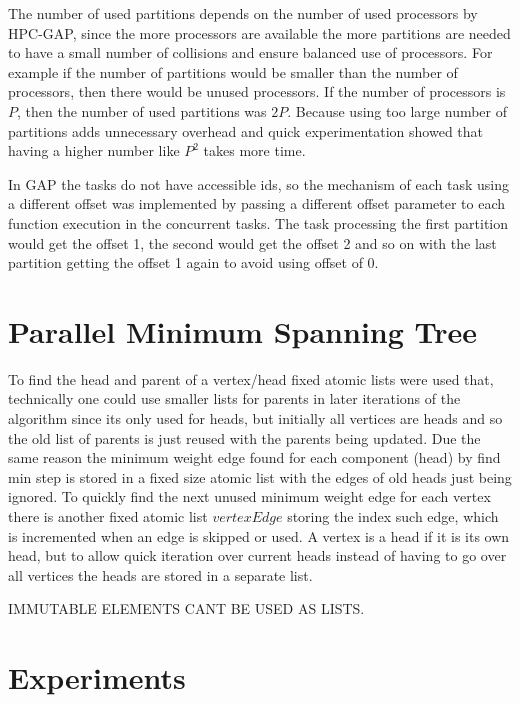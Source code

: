 \documentclass{report}
\theoremstyle{plain}
\theoremstyle{definition}
\theoremstyle{remark}
\begin{document}
The number of used partitions depends on the number of used processors by HPC-GAP, since the more processors are available the more partitions are needed to have a small number of collisions and ensure balanced use of processors. For example if the number of partitions would be smaller than the number of processors, then there would be unused processors. If the number of processors is $P$, then the number of used partitions was $2P$. Because using too large number of partitions adds unnecessary overhead and quick experimentation showed that having a higher number like $P^2$ takes more time.

In GAP the tasks do not have accessible ids, so the mechanism of each task using a different offset was implemented by passing a different offset parameter to each function execution in the concurrent tasks. The task processing the first partition would get the offset 1, the second would get the offset 2 and so on with the last partition getting the offset 1 again to avoid using offset of 0.

\section{Parallel Minimum Spanning Tree}

To find the head and parent of a vertex/head fixed atomic lists were used that, technically one could use smaller lists for parents in later iterations of the algorithm since its only used for heads, but initially all vertices are heads and so the old list of parents is just reused with the parents being updated. Due the same reason the minimum weight edge found for each component (head) by find min step is stored in a fixed size atomic list with the edges of old heads just being ignored. To quickly find the next unused minimum weight edge for each vertex there is another fixed atomic list $vertexEdge$ storing the index such edge, which is incremented when an edge is skipped or used. A vertex is a head if it is its own head, but to allow quick iteration over current heads instead of having to go over all vertices the heads are stored in a separate list.

IMMUTABLE ELEMENTS CANT BE USED AS LISTS.

\section{Experiments}
\end{document}
